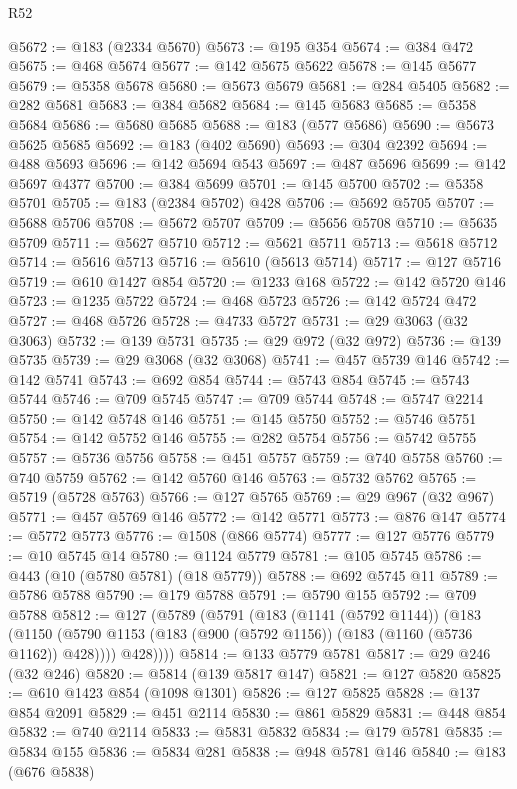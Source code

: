 \begin{lexlean}{R52}
\begin{coremodule}
@5672 := @183 (@2334 @5670)
@5673 := @195 @354
@5674 := @384 @472
@5675 := @468 @5674
@5677 := @142 @5675 @5622
@5678 := @145 @5677
@5679 := @5358 @5678
@5680 := @5673 @5679
@5681 := @284 @5405
@5682 := @282 @5681
@5683 := @384 @5682
@5684 := @145 @5683
@5685 := @5358 @5684
@5686 := @5680 @5685
@5688 := @183 (@577 @5686)
@5690 := @5673 @5625 @5685
@5692 := @183 (@402 @5690)
@5693 := @304 @2392
@5694 := @488 @5693
@5696 := @142 @5694 @543
@5697 := @487 @5696
@5699 := @142 @5697 @4377
@5700 := @384 @5699
@5701 := @145 @5700
@5702 := @5358 @5701
@5705 := @183 (@2384 @5702) @428
@5706 := @5692 @5705
@5707 := @5688 @5706
@5708 := @5672 @5707
@5709 := @5656 @5708
@5710 := @5635 @5709
@5711 := @5627 @5710
@5712 := @5621 @5711
@5713 := @5618 @5712
@5714 := @5616 @5713
@5716 := @5610 (@5613 @5714)
@5717 := @127 @5716
@5719 := @610 @1427 @854
@5720 := @1233 @168
@5722 := @142 @5720 @146
@5723 := @1235 @5722
@5724 := @468 @5723
@5726 := @142 @5724 @472
@5727 := @468 @5726
@5728 := @4733 @5727
@5731 := @29 @3063 (@32 @3063)
@5732 := @139 @5731
@5735 := @29 @972 (@32 @972)
@5736 := @139 @5735
@5739 := @29 @3068 (@32 @3068)
@5741 := @457 @5739 @146
@5742 := @142 @5741
@5743 := @692 @854
@5744 := @5743 @854
@5745 := @5743 @5744
@5746 := @709 @5745
@5747 := @709 @5744
@5748 := @5747 @2214
@5750 := @142 @5748 @146
@5751 := @145 @5750
@5752 := @5746 @5751
@5754 := @142 @5752 @146
@5755 := @282 @5754
@5756 := @5742 @5755
@5757 := @5736 @5756
@5758 := @451 @5757
@5759 := @740 @5758
@5760 := @740 @5759
@5762 := @142 @5760 @146
@5763 := @5732 @5762
@5765 := @5719 (@5728 @5763)
@5766 := @127 @5765
@5769 := @29 @967 (@32 @967)
@5771 := @457 @5769 @146
@5772 := @142 @5771
@5773 := @876 @147
@5774 := @5772 @5773
@5776 := @1508 (@866 @5774)
@5777 := @127 @5776
@5779 := @10 @5745 @14
@5780 := @1124 @5779
@5781 := @105 @5745
@5786 := @443 (@10 (@5780 @5781) (@18 @5779))
@5788 := @692 @5745 @11
@5789 := @5786 @5788
@5790 := @179 @5788
@5791 := @5790 @155
@5792 := @709 @5788
@5812 := @127
    (@5789
      (@5791
        (@183
          (@1141 (@5792 @1144))
          (@183
            (@1150 (@5790 @1153 (@183 (@900 (@5792 @1156)) (@183 (@1160 (@5736 @1162)) @428))))
            @428))))
@5814 := @133 @5779 @5781
@5817 := @29 @246 (@32 @246)
@5820 := @5814 (@139 @5817 @147)
@5821 := @127 @5820
@5825 := @610 @1423 @854 (@1098 @1301)
@5826 := @127 @5825
@5828 := @137 @854 @2091
@5829 := @451 @2114
@5830 := @861 @5829
@5831 := @448 @854
@5832 := @740 @2114
@5833 := @5831 @5832
@5834 := @179 @5781
@5835 := @5834 @155
@5836 := @5834 @281
@5838 := @948 @5781 @146
@5840 := @183 (@676 @5838)

\end{coremodule}
\end{lexlean}
